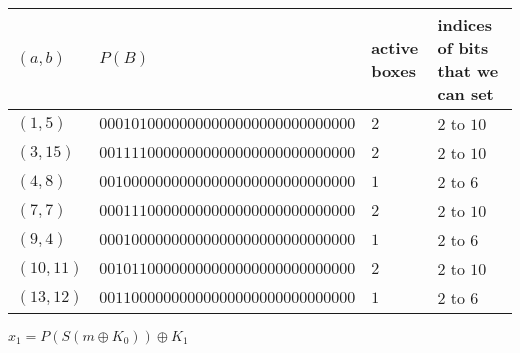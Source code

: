 \begin{enumerate}[label=\textbf{\arabic*})]
    \begin{tabular}{llll}
        $(a, b)$ & $P(B)$ & active boxes & indices of bits that we can set \\
        \hline
        $(1, 5)$    & $00010100000000000000000000000000$ & $2$ & $2$ to $10$\\
        $(3, 15)$   & $00111100000000000000000000000000$ & $2$ & $2$ to $10$\\
        $(4, 8)$    & $00100000000000000000000000000000$ & $1$ & $2$ to $6$\\
        $(7, 7)$    & $00011100000000000000000000000000$ & $2$ & $2$ to $10$\\
        $(9, 4)$    & $00010000000000000000000000000000$ & $1$ & $2$ to $6$\\
        $(10, 11)$  & $00101100000000000000000000000000$ & $2$ & $2$ to $10$\\
        $(13, 12)$  & $00110000000000000000000000000000$ & $1$ & $2$ to $6$\\
    \end{tabular}

    $x_1 = P(S(m \oplus K_0))\oplus K_1$
\end{enumerate}


